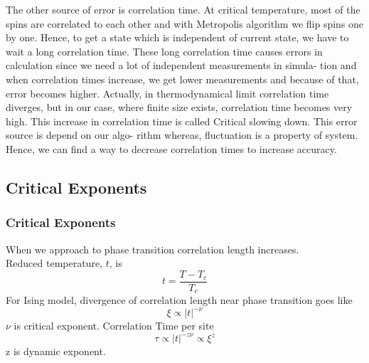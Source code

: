 \documentclass[10pt]{beamer}
\begin{document}
{The other source of error is correlation time. At critical temperature, most of the spins are correlated to each other and with Metropolis algorithm we flip spins one by one. Hence, to get a state which is independent of current state, we have to wait a long correlation time. These long correlation time causes errors in calculation since we need a lot of independent measurements in simula- tion and when correlation times increase, we get lower measurements and because of that, error becomes higher. Actually, in thermodynamical limit correlation time diverges, but in our case, where finite size exists, correlation time becomes very high. This increase in correlation time is called Critical slowing down. This error source is depend on our algo- rithm whereas, fluctuation is a property of system. Hence, we can find a way to decrease correlation times to increase accuracy.

}

\subsection{Critical Exponents}
\begin{frame}
\frametitle{Critical Exponents}
When we approach to phase transition correlation length increases. \\
Reduced temperature, $t$, is
\begin{equation}
t = \frac{T- T_c}{T_c}
\end{equation}
For Ising model, divergence of correlation length near phase transition goes like
\begin{equation}
\xi \propto |t|^{-\nu}
\end{equation}
$\nu$ is critical exponent.
Correlation Time per site 
\begin{equation}
\tau \propto |t|^{-z \nu} \propto \xi^{z}
\end{equation}
z is dynamic exponent.
\end{frame}
\end{document}
